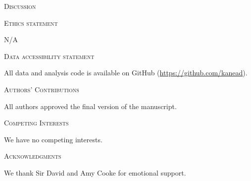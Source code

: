 \documentclass[12pt,letterpaper]{article}
\renewcommand{\section}[1]{%
\bigskip
\begin{center}
\begin{Large}
\normalfont\scshape #1
\medskip
\end{Large}
\end{center}}
\begin{document}
%
%

\section{Discussion}

\section{Ethics statement}
N/A
\section{Data accessibility statement}
All data and analysis code is available on GitHub (\url{https://github.com/kanead}).
\section{Authors' Contributions}
All authors approved the final version of the manuscript.
\section{Competing Interests}
We have no competing interests.
\section{Acknowledgments}
We thank Sir David and Amy Cooke for emotional support.




\end{document}
